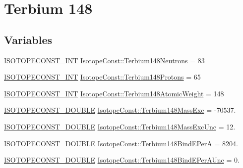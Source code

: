 \hypertarget{group___isotope_const-_terbium-_tb148}{}\section{Terbium 148}
\label{group___isotope_const-_terbium-_tb148}
\subsection*{Variables}
\begin{DoxyCompactItemize}
\item 
\mbox{\hyperlink{group___isotope_const-_macros_ga5f18360b3e99483a35c32d789e62621c}{I\+S\+O\+T\+O\+P\+E\+C\+O\+N\+S\+T\+\_\+\+I\+NT}} \mbox{\hyperlink{group___isotope_const-_terbium-_tb148_gaa2ed213dcf14dcffc66aa8aa5ffc428a}{Isotope\+Const\+::\+Terbium148\+Neutrons}} = 83
\item 
\mbox{\hyperlink{group___isotope_const-_macros_ga5f18360b3e99483a35c32d789e62621c}{I\+S\+O\+T\+O\+P\+E\+C\+O\+N\+S\+T\+\_\+\+I\+NT}} \mbox{\hyperlink{group___isotope_const-_terbium-_tb148_ga3c5d5f0864f081d2137f2a0eaa69ec52}{Isotope\+Const\+::\+Terbium148\+Protons}} = 65
\item 
\mbox{\hyperlink{group___isotope_const-_macros_ga5f18360b3e99483a35c32d789e62621c}{I\+S\+O\+T\+O\+P\+E\+C\+O\+N\+S\+T\+\_\+\+I\+NT}} \mbox{\hyperlink{group___isotope_const-_terbium-_tb148_gac04096b0fa9e617bca6c0cac1af536af}{Isotope\+Const\+::\+Terbium148\+Atomic\+Weight}} = 148
\item 
\mbox{\hyperlink{group___isotope_const-_macros_ga8f45a7272ce02c0b4c65c44636ed719a}{I\+S\+O\+T\+O\+P\+E\+C\+O\+N\+S\+T\+\_\+\+D\+O\+U\+B\+LE}} \mbox{\hyperlink{group___isotope_const-_terbium-_tb148_ga271dd9dd29be1b69cdbfdc4c49c16448}{Isotope\+Const\+::\+Terbium148\+Mass\+Exc}} = -\/70537.
\item 
\mbox{\hyperlink{group___isotope_const-_macros_ga8f45a7272ce02c0b4c65c44636ed719a}{I\+S\+O\+T\+O\+P\+E\+C\+O\+N\+S\+T\+\_\+\+D\+O\+U\+B\+LE}} \mbox{\hyperlink{group___isotope_const-_terbium-_tb148_gae7d67e8dffdd59c50efca6190f0bb47f}{Isotope\+Const\+::\+Terbium148\+Mass\+Exc\+Unc}} = 12.
\item 
\mbox{\hyperlink{group___isotope_const-_macros_ga8f45a7272ce02c0b4c65c44636ed719a}{I\+S\+O\+T\+O\+P\+E\+C\+O\+N\+S\+T\+\_\+\+D\+O\+U\+B\+LE}} \mbox{\hyperlink{group___isotope_const-_terbium-_tb148_ga8a725113dd3a259ad090ca70ec796198}{Isotope\+Const\+::\+Terbium148\+Bind\+E\+PerA}} = 8204.
\item 
\mbox{\hyperlink{group___isotope_const-_macros_ga8f45a7272ce02c0b4c65c44636ed719a}{I\+S\+O\+T\+O\+P\+E\+C\+O\+N\+S\+T\+\_\+\+D\+O\+U\+B\+LE}} \mbox{\hyperlink{group___isotope_const-_terbium-_tb148_ga10980f8e6223de894fa0e5e7a3cdbbfa}{Isotope\+Const\+::\+Terbium148\+Bind\+E\+Per\+A\+Unc}} = 0.

\end{DoxyCompactItemize}
